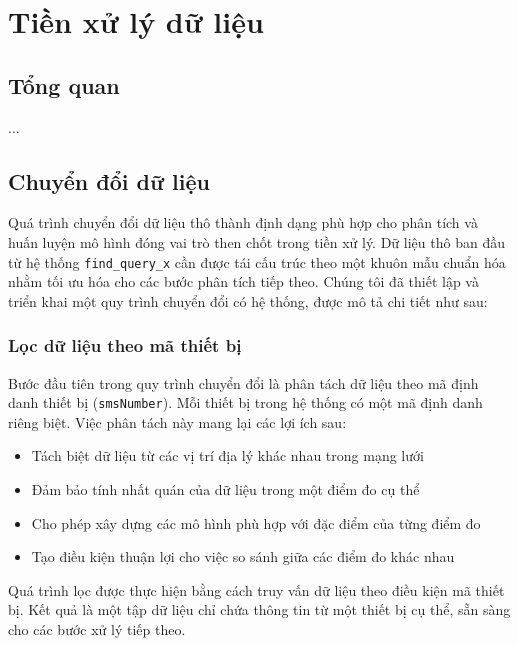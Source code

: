 \section{Tiền xử lý dữ liệu}
\subsection{Tổng quan}
...
\subsection{Chuyển đổi dữ liệu}
Quá trình chuyển đổi dữ liệu thô thành định dạng phù hợp cho phân tích và huấn luyện mô hình đóng vai trò then chốt trong tiền xử lý. Dữ liệu thô ban đầu từ hệ thống \texttt{find\_query\_x} cần được tái cấu trúc theo một khuôn mẫu chuẩn hóa nhằm tối ưu hóa cho các bước phân tích tiếp theo. Chúng tôi đã thiết lập và triển khai một quy trình chuyển đổi có hệ thống, được mô tả chi tiết như sau:

\subsubsection{Lọc dữ liệu theo mã thiết bị}
Bước đầu tiên trong quy trình chuyển đổi là phân tách dữ liệu theo mã định danh thiết bị (\texttt{smsNumber}). Mỗi thiết bị trong hệ thống có một mã định danh riêng biệt. Việc phân tách này mang lại các lợi ích sau:

\begin{itemize}
    \item Tách biệt dữ liệu từ các vị trí địa lý khác nhau trong mạng lưới
    \item Đảm bảo tính nhất quán của dữ liệu trong một điểm đo cụ thể
    \item Cho phép xây dựng các mô hình phù hợp với đặc điểm của từng điểm đo
    \item Tạo điều kiện thuận lợi cho việc so sánh giữa các điểm đo khác nhau
\end{itemize}

Quá trình lọc được thực hiện bằng cách truy vấn dữ liệu theo điều kiện mã thiết bị. Kết quả là một tập dữ liệu chỉ chứa thông tin từ một thiết bị cụ thể, sẵn sàng cho các bước xử lý tiếp theo.


